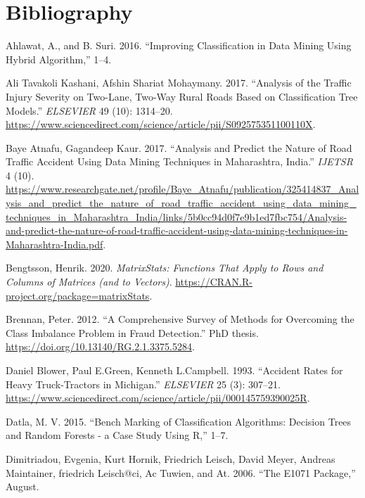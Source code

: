 \documentclass[
  a4paper,
]{article}
\begin{document}
\newpage
\newpage

\hypertarget{bibliography}{%
\section*{Bibliography}\label{bibliography}}

\hypertarget{refs}{}
\leavevmode\hypertarget{ref-7975380}{}%
Ahlawat, A., and B. Suri. 2016. ``Improving Classification in Data
Mining Using Hybrid Algorithm,'' 1--4.

\leavevmode\hypertarget{ref-ali}{}%
Ali Tavakoli Kashani, Afshin Shariat Mohaymany. 2017. ``Analysis of the
Traffic Injury Severity on Two-Lane, Two-Way Rural Roads Based on
Classification Tree Models.'' \emph{ELSEVIER} 49 (10): 1314--20.
\url{https://www.sciencedirect.com/science/article/pii/S092575351100110X}.

\leavevmode\hypertarget{ref-atnafu}{}%
Baye Atnafu, Gagandeep Kaur. 2017. ``Analysis and Predict the Nature of
Road Traffic Accident Using Data Mining Techniques in Maharashtra,
India.'' \emph{IJETSR} 4 (10).
\url{https://www.researchgate.net/profile/Baye_Atnafu/publication/325414837_Analysis_and_predict_the_nature_of_road_traffic_accident_using_data_mining_techniques_in_Maharashtra_India/links/5b0cc94d0f7e9b1ed7fbc754/Analysis-and-predict-the-nature-of-road-traffic-accident-using-data-mining-techniques-in-Maharashtra-India.pdf}.

\leavevmode\hypertarget{ref-matrix}{}%
Bengtsson, Henrik. 2020. \emph{MatrixStats: Functions That Apply to Rows
and Columns of Matrices (and to Vectors)}.
\url{https://CRAN.R-project.org/package=matrixStats}.

\leavevmode\hypertarget{ref-brennan}{}%
Brennan, Peter. 2012. ``A Comprehensive Survey of Methods for Overcoming
the Class Imbalance Problem in Fraud Detection.'' PhD thesis.
\url{https://doi.org/10.13140/RG.2.1.3375.5284}.

\leavevmode\hypertarget{ref-blower}{}%
Daniel Blower, Paul E.Green, Kenneth L.Campbell. 1993. ``Accident Rates
for Heavy Truck-Tractors in Michigan.'' \emph{ELSEVIER} 25 (3): 307--21.
\url{https://www.sciencedirect.com/science/article/pii/000145759390025R}.

\leavevmode\hypertarget{ref-7492647}{}%
Datla, M. V. 2015. ``Bench Marking of Classification Algorithms:
Decision Trees and Random Forests - a Case Study Using R,'' 1--7.

\leavevmode\hypertarget{ref-e1071}{}%
Dimitriadou, Evgenia, Kurt Hornik, Friedrich Leisch, David Meyer,
Andreas Maintainer, friedrich Leisch@ci, Ac Tuwien, and At. 2006. ``The
E1071 Package,'' August.
\end{document}
